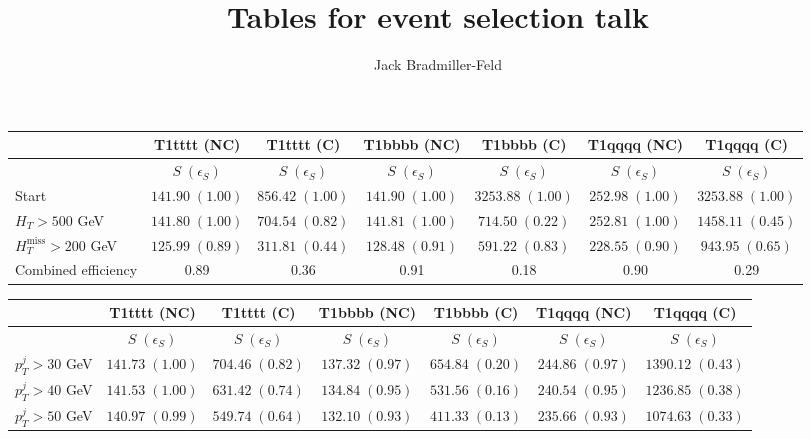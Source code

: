 \documentclass[11pt]{amsart}
\title{Tables for event selection talk}
\author{Jack Bradmiller-Feld}
\newcommand{\HT}{H_{T}}
\newcommand{\MHT}{H_{T}^{\mathrm{miss}}}
\begin{document}
\maketitle

\begin{table}[h]
\centering
\begin{tabular}{lcccccc}
\hline
\hline
& T1tttt (NC) & T1tttt (C) & T1bbbb (NC) & T1bbbb (C) & T1qqqq (NC) & T1qqqq (C) \\ \hline
& $S\;(\epsilon_S)$ & $S\;(\epsilon_S)$ & $S\;(\epsilon_S)$ & $S\;(\epsilon_S)$ & $S\;(\epsilon_S)$ &$S\;(\epsilon_S)$ \\ \hline
Start & $141.90\;(1.00)$ & $856.42\;(1.00)$ & $141.90\;(1.00)$ & $3253.88\;(1.00)$ & $252.98\;(1.00)$ & $3253.88\;(1.00)$ \\
$\HT > 500$ GeV & $141.80\;(1.00)$ & $704.54\;(0.82)$ & $141.81\;(1.00)$ & $714.50\;(0.22)$ & $252.81\;(1.00)$ & $1458.11\;(0.45)$ \\
$\MHT > 200$ GeV & $125.99\;(0.89)$ & $311.81\;(0.44)$ & $128.48\;(0.91)$ & $591.22\;(0.83)$ & $228.55\;(0.90)$ & $943.95\;(0.65)$ \\\hline
Combined efficiency & 0.89 & 0.36 & 0.91 & 0.18 & 0.90 & 0.29 \\
\hline
\hline
\end{tabular}
\end{table}

\begin{table}[h]
\centering
\begin{tabular}{lcccccc}
\hline
\hline
& T1tttt (NC) & T1tttt (C) & T1bbbb (NC) & T1bbbb (C) & T1qqqq (NC) & T1qqqq (C) \\ \hline
& $S\;(\epsilon_S)$ & $S\;(\epsilon_S)$ & $S\;(\epsilon_S)$ & $S\;(\epsilon_S)$ & $S\;(\epsilon_S)$ &$S\;(\epsilon_S)$ \\ \hline
$p_{T}^{j} > 30$ GeV & $141.73\;(1.00)$ & $704.46\;(0.82)$ & $137.32\;(0.97)$ & $654.84\;(0.20)$ & $244.86\;(0.97)$ & $1390.12\;(0.43)$ \\
$p_{T}^{j} > 40$ GeV & $141.53\;(1.00)$ & $631.42\;(0.74)$ & $134.84\;(0.95)$ & $531.56\;(0.16)$ & $240.54\;(0.95)$ & $1236.85\;(0.38)$ \\
$p_{T}^{j} > 50$ GeV & $140.97\;(0.99)$ & $549.74\;(0.64)$ & $132.10\;(0.93)$ & $411.33\;(0.13)$ & $235.66\;(0.93)$ & $1074.63\;(0.33)$ \\
\hline
\hline
\end{tabular}
\end{table}
\end{document}
